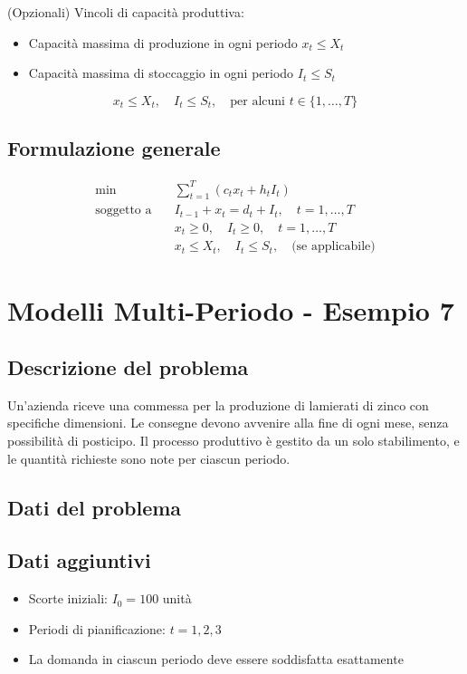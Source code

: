 (Opzionali) Vincoli di capacità produttiva:
\begin{itemize}
    \item Capacità massima di produzione in ogni periodo $x_t \leq X_t$
    \item Capacità massima di stoccaggio in ogni periodo $I_t \leq S_t$
\end{itemize}

\[ 
x_t \leq X_t, \quad I_t \leq S_t, \quad \text{per alcuni } t \in \{1, \dots, T\}
\]

\subsection{Formulazione generale}
\[ 
\begin{aligned}
\min \quad & \sum_{t=1}^{T} \left( c_t x_t + h_t I_t \right) \\
\text{soggetto a} \quad 
& I_{t-1} + x_t = d_t + I_t, \quad t = 1, \dots, T \\
& x_t \geq 0, \quad I_t \geq 0, \quad t = 1, \dots, T \\
& x_t \leq X_t, \quad I_t \leq S_t, \quad \text{(se applicabile)}
\end{aligned}
\]

\section{Modelli Multi-Periodo - Esempio 7}

\subsection{Descrizione del problema}

Un'azienda riceve una commessa per la produzione di lamierati di zinco 
con specifiche dimensioni. Le consegne devono avvenire alla fine di ogni mese, 
senza possibilità di posticipo. Il processo produttivo è gestito da un 
solo stabilimento, e le quantità richieste sono note per ciascun periodo.

\subsection{Dati del problema}

\subsection{Dati aggiuntivi}
\begin{itemize}
    \item Scorte iniziali: $I_0 = 100$ unità
    \item Periodi di pianificazione: $t = 1, 2, 3$
    \item La domanda in ciascun periodo deve essere soddisfatta esattamente
\end{itemize}

